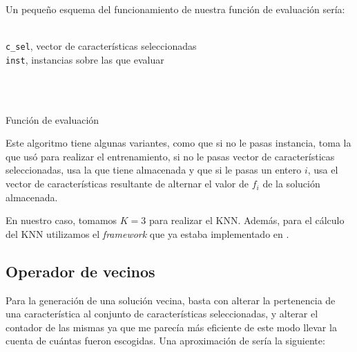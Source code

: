 \documentclass[a4paper, 11pt]{article}
\begin{document}
			Un pequeño esquema del funcionamiento de nuestra función de evaluación sería:

			\begin{algorithm}[H]
				\begin{algorithmic}[1]

					\REQUIRE \ \\
			        	\texttt{c\_sel}, vector de características seleccionadas\\
			        	\texttt{inst}, instancias sobre las que evaluar\\ \

			     	\\
						\ELSE
						\ENDIF
				  		
						\ENDIF
					\ENDFOR
				  
				\end{algorithmic}
			    \caption{Función de evaluación}
			    \label{Evaluate}
			\end{algorithm}
			
			Este algoritmo tiene algunas variantes, como que si no le pasas instancia, toma la que
			usó para realizar el entrenamiento, si no le pasas vector de características seleccionadas,
			usa la que tiene almacenada y que si le pasas un entero $i$, usa el vector de características
			resultante de alternar el valor de $f_i$ de la solución almacenada.
			
			En nuestro caso, tomamos $K=3$ para realizar el KNN. Además, para el cálculo del KNN
			utilizamos el \textit{framework} que ya estaba implementado en \cite{KNN}.
		
		\subsection{Operador de vecinos}
			Para la generación de una solución vecina, basta con alterar la pertenencia de una
			característica al conjunto de características seleccionadas, y alterar el contador
			de las mismas ya que me parecía más eficiente de este modo llevar la cuenta de cuántas
			fueron escogidas. Una aproximación de sería la siguiente:
			
\end{document}
